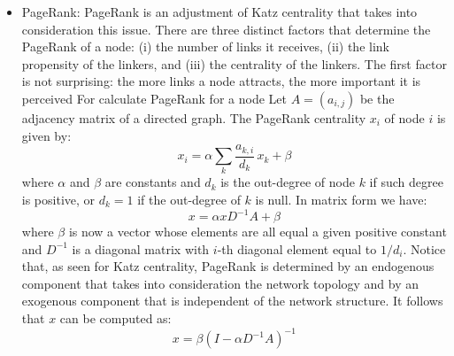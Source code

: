 \documentclass[conference]{IEEEtran}
\begin{document}
\begin{itemize}
      The free parameter $\alpha$, known as the damping factor, should be chosen with case. For small (close to 0) values of $\alpha$ the contribution given by paths longer than one rapidly declines, and thus Katz scores are mainly influenced by short paths (mostly in-degrees) and by the exogenous factor of the system.
    \item PageRank: PageRank is an adjustment of Katz centrality that takes into consideration this issue. There are three distinct factors that determine the PageRank 
    of a node: (i) the number of links it receives, (ii) the link propensity of the linkers, and (iii) the centrality of the linkers. 
    The first factor is not surprising: the more links a node attracts, the more important it is perceived
    For calculate PageRank for a node Let $A = (a_{i,j})$ be the adjacency matrix of a directed graph. The PageRank centrality $x_{i}$ of node $i$ is given by: $$x_i = \alpha \sum_k \frac{a_{k,i}}{d_k} \, x_k + \beta$$ where $\alpha$ and $\beta$ are constants and $d_k$ is the out-degree of node $k$ if such degree is positive, or $d_k = 1$ if the out-degree of $k$ is null. In matrix form we have: $$x = \alpha x D^{-1}A + \beta$$ where $\beta$ is now a vector whose elements are all equal a given positive constant and $D^{-1}$ is a diagonal matrix with $i$-th diagonal element equal to $1/d_{i}$. Notice that, as seen for Katz centrality, PageRank is determined by an endogenous component that takes into consideration the network topology and by an exogenous component that is independent of the network structure. It follows that $x$ can be computed as: $$x = \beta (I - \alpha D^{-1}A)^{-1}$$


\end{itemize}
\end{document}
